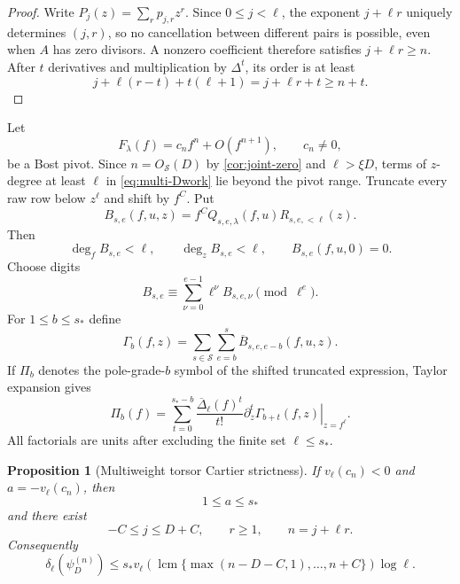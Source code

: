\documentclass[11pt]{article}
\newtheorem{proposition}[proposition]{Proposition}
\theoremstyle{definition}
\theoremstyle{remark}
\newcommand{\lcmop}{\operatorname{lcm}}
\begin{document}
\begin{proof}
Write $P_j(z)=\sum_rp_{j,r}z^r$.  Since $0\le j<\ell$, the exponent
$j+\ell r$ uniquely determines $(j,r)$, so no cancellation between different
pairs is possible, even when $A$ has zero divisors.  A nonzero coefficient
therefore satisfies $j+\ell r\ge n$.  After $t$ derivatives and multiplication
by $\Delta^t$, its order is at least
\[
 j+\ell(r-t)+t(\ell+1)=j+\ell r+t\ge n+t.
\]
\end{proof}

Let
\[
 F_\lambda(f)=c_nf^n+O(f^{n+1}),\qquad c_n\ne0,
\]
be a Bost pivot.  Since $n=O_{\mathcal S}(D)$ by
\cref{cor:joint-zero} and $\ell>\xi D$, terms of $z$-degree at least $\ell$ in
\eqref{eq:multi-Dwork} lie beyond the pivot range.  Truncate every raw row
below $z^\ell$ and shift by $f^C$.  Put
\begin{equation}\label{eq:Bse}
 B_{s,e}(f,u,z)=f^CQ_{s,e,\lambda}(f,u)R_{s,e,<\ell}(z).
\end{equation}
Then
\[
 \deg_fB_{s,e}<\ell,
 \qquad \deg_zB_{s,e}<\ell,
 \qquad B_{s,e}(f,u,0)=0.
\]
Choose digits
\begin{equation}\label{eq:digits}
 B_{s,e}\equiv\sum_{\nu=0}^{e-1}\ell^\nu B_{s,e,\nu}
 \pmod{\ell^e}.
\end{equation}
For $1\le b\le s_*$ define
\begin{equation}\label{eq:Gamma-b}
 \Gamma_b(f,z)=
 \sum_{s\in\mathcal S}\sum_{e=b}^s
 \overline B_{s,e,e-b}(f,u,z).
\end{equation}
If $\Pi_b$ denotes the pole-grade-$b$ symbol of the shifted truncated
expression, Taylor expansion gives
\begin{equation}\label{eq:pole-symbol}
 \boxed{
 \Pi_b(f)=\sum_{t=0}^{s_*-b}
 \frac{\overline\Delta_\ell(f)^t}{t!}
 \left.\partial_z^t\Gamma_{b+t}(f,z)\right|_{z=f^\ell}.}
\end{equation}
All factorials are units after excluding the finite set $\ell\le s_*$.

\begin{proposition}[Multiweight torsor Cartier strictness]
\label{prop:multi-Cartier}
If $v_\ell(c_n)<0$ and $a=-v_\ell(c_n)$, then
\[
 1\le a\le s_*
\]
and there exist
\[
 -C\le j\le D+C,
 \qquad r\ge1,
 \qquad n=j+\ell r.
\]
Consequently
\begin{equation}\label{eq:rect-local}
 \delta_\ell(\psi_D^{(n)})
 \le s_*v_\ell
 \left(\lcmop\{\max(n-D-C,1),\ldots,n+C\}\right)\log\ell.
\end{equation}
\end{proposition}
\end{document}
